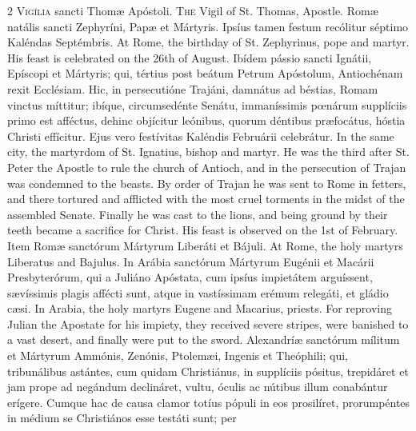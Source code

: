 \begin{paracol}{2}
\lettrine[lines=1]{V}{igília} sancti Thomæ Apóstoli.
\switchcolumn
{}
\lettrine[lines=1]{T}{he} Vigil of St. Thomas, Apostle.
\switchcolumn*
{}
Romæ natális sancti Zephyríni, Papæ et Mártyris. 
 Ipsíus tamen festum recólitur séptimo Kaléndas Septémbris.
\switchcolumn
{}
At Rome, the birthday of St. Zephyrinus, pope and martyr. His feast is 
 celebrated on the 26th of August.
\switchcolumn*
{}
Ibídem pássio sancti Ignátii, Epíscopi et Mártyris; qui, tértius post beátum 
 Petrum Apóstolum, Antiochénam rexit Ecclésiam. Hic, in persecutióne 
 Trajáni, damnátus ad béstias, Romam vinctus míttitur; ibíque, circumsedénte 
 Senátu, immaníssimis pœnárum supplíciis primo 
 est afféctus, dehinc objícitur leónibus, quorum déntibus præfocátus, hóstia 
 Christi effícitur. Ejus vero festívitas Kaléndis Februárii celebrátur.
\switchcolumn
{}
In the same city, the martyrdom of St. Ignatius, bishop and martyr. He 
 was the third after St. Peter the Apostle to rule the church of Antioch, and 
 in the persecution of Trajan was condemned to the beasts. By order of 
 Trajan he was sent to Rome in fetters, and there tortured and afflicted with 
 the most cruel torments in the midst of the assembled Senate. Finally 
 he was cast to the lions, and being ground by their teeth became a sacrifice 
 for Christ. His feast is observed on the 1st of February.
\switchcolumn*
{}
Item Romæ sanctórum Mártyrum Liberáti et Bájuli.
\switchcolumn
{}
At Rome, the holy martyrs Liberatus and Bajulus.
\switchcolumn*
{}
In Arábia sanctórum Mártyrum Eugénii et Macárii Presbyterórum, qui a Juliáno Apóstata, cum ipsíus impietátem arguíssent, sævíssimis 
 plagis affécti sunt, atque in vastíssimam erémum relegáti, et gládio cæsi.
\switchcolumn
{}
In Arabia, the holy martyrs Eugene and Macarius, priests. For 
 reproving Julian the Apostate for his impiety, they received severe stripes, 
 were banished to a vast desert, and finally were put to the sword.
\switchcolumn*
{}
Alexandríæ sanctórum mílitum et Mártyrum Ammónis, Zenónis, Ptolemæi, Ingenis et
  Theóphili; qui, tribunálibus astántes, cum quidam Christiánus, in supplíciis
  pósitus, trepidáret et jam prope ad negándum declináret, vultu, óculis ac
  nútibus illum conabántur erígere. Cumque hac de causa clamor totíus pópuli in
  eos prosilíret, prorumpéntes in médium se Christiános esse testáti sunt; per

\end{paracol}
